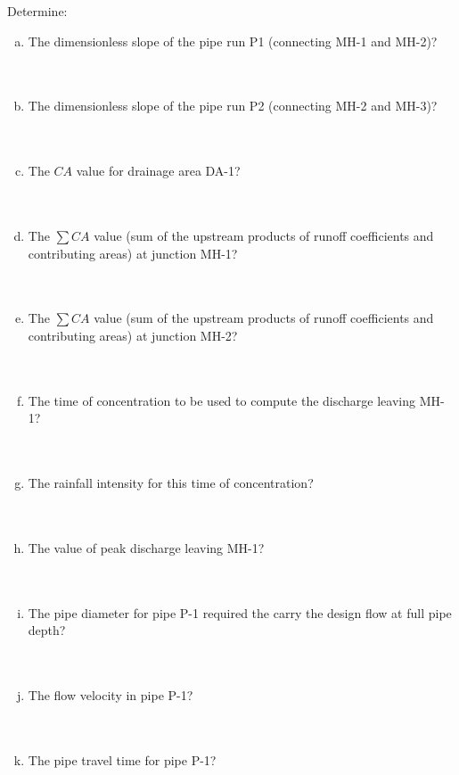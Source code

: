 \documentclass[12pt]{article}
\begin{document}
\begin{enumerate}
Determine: 
\begin{enumerate}[a)]
\item The dimensionless slope of the pipe run P1 (connecting MH-1 and MH-2)? \\~\\~\\
\item The dimensionless slope of the pipe run P2 (connecting MH-2 and MH-3)?  \\~\\~\\
\item The $CA$ value for drainage area DA-1?  \\~\\~\\
\newpage
\item The $\sum{CA}$ value (sum of the upstream products of runoff coefficients and contributing areas) at junction MH-1?  \\~\\~\\
\item The $\sum{CA}$ value (sum of the upstream products of runoff coefficients and contributing areas) at junction MH-2?  \\~\\~\\
\item The time of concentration to be used to compute the discharge leaving MH-1?  \\~\\~\\
\item The rainfall intensity for this time of concentration?  \\~\\~\\
\item The value of peak discharge leaving MH-1?  \\~\\~\\
\item The pipe diameter for pipe P-1 required the carry the design flow at full pipe depth? \\~\\~\\  
\item The flow velocity in pipe P-1?  \\~\\~\\
\item The pipe travel time for pipe P-1?  \\~\\~\\

\end{enumerate}
\end{enumerate}
\end{document}
